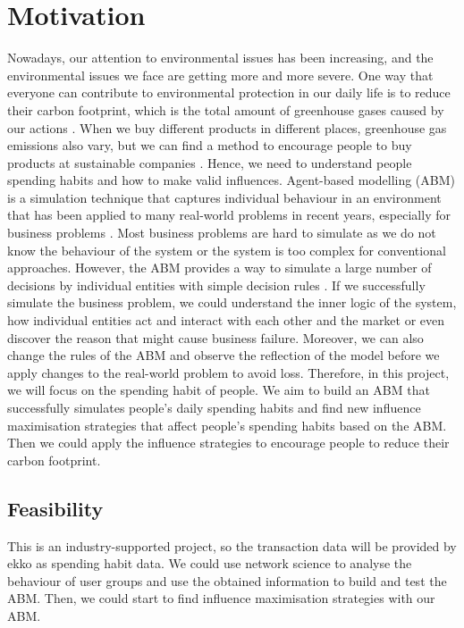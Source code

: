 \documentclass[a4paper,11pt]{article}
\begin{document}
\setcounter{page}{1}                            %
\footruleheight{1pt}
\headruleheight{1pt}
\rhead{- \thepage}
\cfoot{}
%


\section{Motivation}

Nowadays, our attention to environmental issues has been increasing, and the environmental issues we face are getting more and more severe. One way that everyone can contribute to environmental protection in our daily life is to reduce their carbon footprint, which is the total amount of greenhouse gases caused by our actions \cite{3}. When we buy different products in different places, greenhouse gas emissions also vary, but we can find a method to encourage people to buy products at sustainable companies \cite{4}. Hence, we need to understand people spending habits and how to make valid influences.
Agent-based modelling (ABM) is a simulation technique that captures individual behaviour in an environment that has been applied to many real-world problems in recent years, especially for business problems \cite{1}.
Most business problems are hard to simulate as we do not know the behaviour of the system or the system is too complex for conventional approaches. However, the ABM provides a way to simulate a large number of decisions by individual entities with simple decision rules \cite{5}. 
If we successfully simulate the business problem, we could understand the inner logic of the system, how individual entities act and interact with each other and the market or even discover the reason that might cause business failure.
Moreover, we can also change the rules of the ABM and observe the reflection of the model before we apply changes to the real-world problem to avoid loss.
Therefore, in this project, we will focus on the spending habit of people. We aim to build an ABM that successfully simulates people's daily spending habits and find new influence maximisation strategies that affect people's spending habits based on the ABM. Then we could apply the influence strategies to encourage people to reduce their carbon footprint.


\subsection{Feasibility}
This is an industry-supported project, so the transaction data will be provided by ekko as spending habit data. We could use network science to analyse the behaviour of user groups and use the obtained information to build and test the ABM. Then, we could start to find influence maximisation strategies with our ABM.
\end{document}
